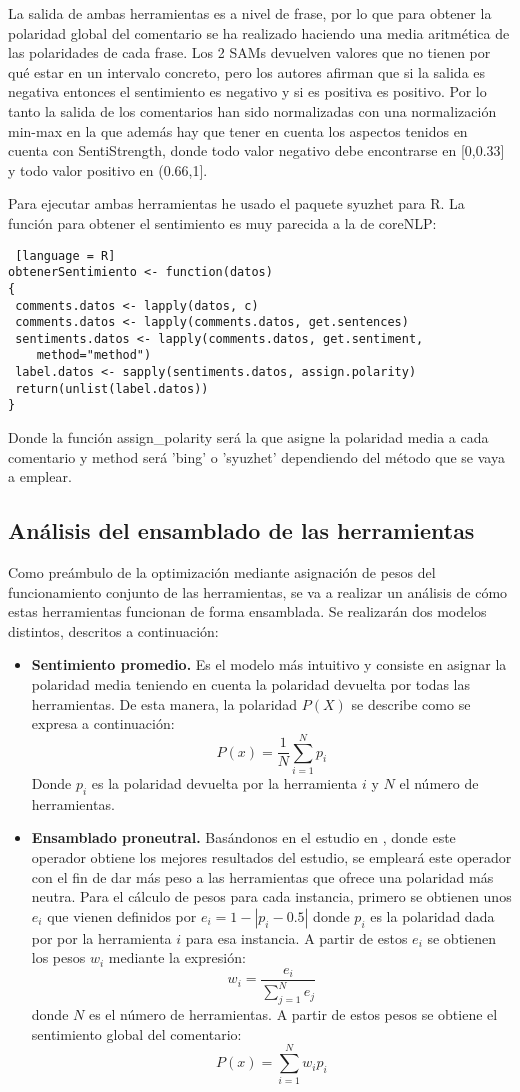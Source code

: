 La salida de ambas herramientas es a nivel de frase, por lo que para obtener la polaridad global del comentario se ha realizado haciendo una media aritmética de las polaridades de cada frase. Los 2 SAMs devuelven valores que no tienen por qué estar en un intervalo concreto, pero los autores afirman que si la salida es negativa entonces el sentimiento es negativo y si es positiva es positivo. Por lo tanto la salida de los comentarios han sido normalizadas con una normalización min-max en la que además hay que tener en cuenta los aspectos tenidos en cuenta con SentiStrength, donde todo valor negativo debe encontrarse en [0,0.33] y todo valor positivo en (0.66,1].

Para ejecutar ambas herramientas he usado el paquete syuzhet para R. La función para obtener el sentimiento es muy parecida a la de coreNLP:
\begin{lstlisting} [language = R]
obtenerSentimiento <- function(datos)
{
 comments.datos <- lapply(datos, c)
 comments.datos <- lapply(comments.datos, get.sentences)
 sentiments.datos <- lapply(comments.datos, get.sentiment,
    method="method")
 label.datos <- sapply(sentiments.datos, assign.polarity)
 return(unlist(label.datos))
}
\end{lstlisting}

Donde la función assign\_polarity será la que asigne la polaridad media a cada comentario y method será 'bing' o 'syuzhet' dependiendo del método que se vaya a emplear.

\subsection{Análisis del ensamblado de las herramientas} \label{ensamble}
Como preámbulo de la optimización mediante asignación de pesos del funcionamiento conjunto de las herramientas, se va a realizar un análisis de cómo estas herramientas funcionan de forma ensamblada. Se realizarán dos modelos distintos, descritos a continuación:
\begin{itemize}
	\item \textbf{Sentimiento promedio.} Es el modelo más intuitivo y consiste en asignar la polaridad media teniendo en cuenta la polaridad devuelta por todas las herramientas. De esta manera, la polaridad $P(X)$ se describe como se expresa a continuación:
	$$P(x) = \frac{1}{N}\sum_{i=1}^{N}p_i$$
	Donde $p_i$ es la polaridad devuelta por la herramienta $i$ y $N$ el número de herramientas.
	\item \textbf{Ensamblado proneutral.} Basándonos en el estudio en \cite{proneu}, donde este operador obtiene los mejores resultados del estudio, se empleará este operador con el fin de dar más peso a las herramientas que ofrece una polaridad más neutra. Para el cálculo de pesos para cada instancia, primero se obtienen unos $e_i$ que vienen definidos por $e_i = 1-|p_i-0.5|$ donde $p_i$ es la polaridad dada por por la herramienta $i$ para esa instancia. A partir de estos $e_i$ se obtienen los pesos $w_i$ mediante la expresión: 
	$$w_i=\frac{e_i}{\sum_{j=1}^{N}e_j}$$ donde $N$ es el número de herramientas. A partir de estos pesos se obtiene el sentimiento global del comentario:
	$$P(x)=\sum_{i=1}^{N}w_ip_i$$
\end{itemize}

